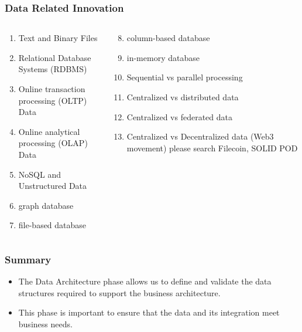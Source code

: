 \documentclass[aspectratio=169, table]{beamer}
\begin{document}
    \begin{frame}
        \frametitle{Data Related Innovation}
        \begin{columns}
            \begin{column}{0.5\textwidth}
                \begin{center}
                    \begin{enumerate}
                        \item Text and Binary Files
                        \item Relational Database Systems (RDBMS)
                        \item Online transaction processing (OLTP) Data
                        \item Online analytical processing (OLAP) Data
                        \item NoSQL and Unstructured Data
                        \item graph database
                        \item file-based database
                    \end{enumerate}
                \end{center}
            \end{column}
            \begin{column}{0.5\textwidth}
                \begin{center}
                    \begin{enumerate}
                        \setcounter{enumi}{7}
                        \item column-based database
                        \item in-memory database
                        \item Sequential vs parallel processing
                        \item Centralized vs distributed data
                        \item Centralized vs federated data
                        \item Centralized vs Decentralized data (Web3 movement) please search Filecoin, SOLID POD
                    \end{enumerate}
                \end{center}
            \end{column}
        \end{columns}
    \end{frame}


    \begin{frame}
        \frametitle{Summary}
        \begin{itemize}
            \item The Data Architecture phase allows us to define and validate the data structures required to support the business architecture.
            \item This phase is important to ensure that the data and its integration meet business needs.
        \end{itemize}
    \end{frame}
\end{document}
